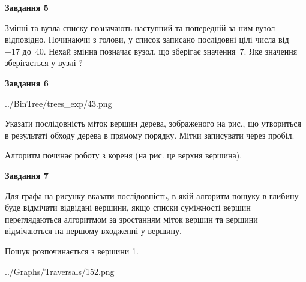 \documentclass[12pt, ukrainian]{article}
\begin{document}
{\begin {large}
{\begin {center}\textbf{Завдання 5}\end {center}}\par
Змінні  та  вузла списку позначають наступний та попередній за ним вузол відповідно. Починаючи з голови, у список записано послідовні цілі числа від~$-17$ до~$40$. Нехай змінна  позначає вузол, що зберігає значення~$7$.
Яке значення зберігається у вузлі  ?\par
\newpage

{\begin {center}\textbf{Завдання 6}\end {center}}\par

\begin{center}
	{../BinTree/trees_exp/43.png}
\end{center}
Указати послідовність міток вершин дерева, зображеного на рис., що утвориться в результаті обходу дерева в прямому порядку. Мітки записувати через пробіл.\par Алгоритм починає роботу з кореня (на рис. це верхня вершина).\par
\newpage

{\begin {center}\textbf{Завдання 7}\end {center}}\par
Для графа на рисунку вказати послідовність, в якій алгоритм пошуку в глибину буде відмічати відвідані вершини, якщо списки суміжності вершин переглядаються алгоритмом за зростанням міток вершин та вершини відмічаються на першому вход\-женні у вершину.\par
Пошук розпочинається з вершини 1.\par

\begin{center}
	{../Graphs/Traversals/152.png}
\end{center}\par
\newpage


\end{large}}
\end{document}
